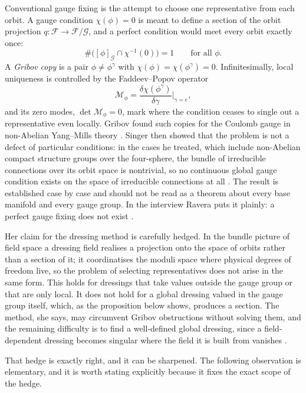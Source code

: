 \documentclass[11pt]{article}
\theoremstyle{plain}
\theoremstyle{definition}
\theoremstyle{remark}
\newcommand{\F}{\mathcal F}
\newcommand{\G}{\mathcal G}
\begin{document}
Conventional gauge fixing is the attempt to choose one representative from each orbit. A gauge condition $\chi(\phi)=0$ is meant to define a section of the orbit projection $q:\F\to\F/\G$, and a perfect condition would meet every orbit exactly once:
\begin{equation}
\#\big([\phi]_\G\cap\chi^{-1}(0)\big)=1\qquad\text{for all }\phi .
\end{equation}
A \emph{Gribov copy} is a pair $\phi\neq\phi^\gamma$ with $\chi(\phi)=\chi(\phi^\gamma)=0$. Infinitesimally, local uniqueness is controlled by the Faddeev--Popov operator
\begin{equation}
\mathcal M_\phi=\frac{\delta\chi(\phi^\gamma)}{\delta\gamma}\Big|_{\gamma=e},
\end{equation}
and its zero modes, $\det\mathcal M_\phi=0$, mark where the condition ceases to single out a representative even locally. Gribov found such copies for the Coulomb gauge in non-Abelian Yang--Mills theory \cite{gribov}. Singer then showed that the problem is not a defect of particular conditions: in the cases he treated, which include non-Abelian compact structure groups over the four-sphere, the bundle of irreducible connections over its orbit space is nontrivial, so no continuous global gauge condition exists on the space of irreducible connections at all \cite{singer}. The result is established case by case and should not be read as a theorem about every base manifold and every gauge group. In the interview Ravera puts it plainly: a perfect gauge fixing does not exist \cite{toe}.

Her claim for the dressing method is carefully hedged. In the bundle picture of field space a dressing field realises a projection onto the space of orbits rather than a section of it; it coordinatises the moduli space where physical degrees of freedom live, so the problem of selecting representatives does not arise in the same form. This holds for dressings that take values outside the gauge group or that are only local. It does not hold for a global dressing valued in the gauge group itself, which, as the proposition below shows, produces a section. The method, she says, may circumvent Gribov obstructions without solving them, and the remaining difficulty is to find a well-defined global dressing, since a field-dependent dressing becomes singular where the field it is built from vanishes \cite{toe}.

That hedge is exactly right, and it can be sharpened. The following observation is elementary, and it is worth stating explicitly because it fixes the exact scope of the hedge.
\end{document}
